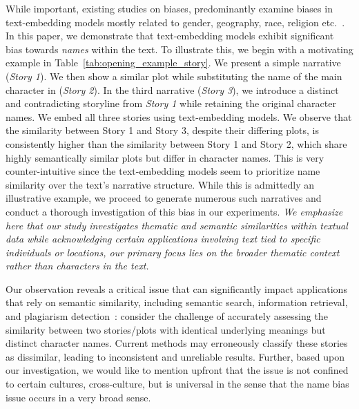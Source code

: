 While important, existing studies on biases, predominantly examine biases in text-embedding models mostly related to gender, geography, race, religion etc.~\citep{rakivnenko2024bias, may2019measuring, bolukbasi2016man, kotek2023gender, nghiem2024you}. In this paper, we demonstrate that text-embedding models exhibit significant bias towards \textit{names} within the text. To illustrate this, we begin with a motivating example in Table~\ref{tab:opening_example_story}. We present a simple narrative (\textit{Story 1}). We then show a similar plot while substituting the name of the main character in (\textit{Story 2}). In the third narrative (\textit{Story 3}), we introduce a distinct and contradicting storyline from \textit{Story 1 }while retaining the original character names. We embed all three stories using text-embedding models.  We observe that the similarity between Story 1 and Story 3, despite their differing plots, is consistently higher than the similarity between Story 1 and Story 2, which share highly semantically similar plots but differ in character names. This is very counter-intuitive since the text-embedding models seem to prioritize name similarity over the text's narrative structure. While this is admittedly an illustrative example, we proceed to generate numerous such narratives and conduct a thorough investigation of this bias in our experiments. {\em We emphasize here that our study investigates thematic and semantic similarities within textual data while acknowledging certain applications involving text tied to specific individuals or locations, our primary focus lies on the broader thematic context rather than characters in the text.}

Our observation reveals a critical issue that can significantly impact applications that rely on semantic similarity, including semantic search, information retrieval, and plagiarism detection~\citep{minaee2024large, pudasaini2024survey}: consider the challenge of accurately assessing the similarity between two stories/plots with identical underlying meanings but distinct character names. Current methods may erroneously classify these stories as dissimilar, leading to inconsistent and unreliable results. Further, based upon our investigation, we would like to mention upfront that the issue is not confined to certain cultures, cross-culture, but is universal in the sense that the name bias issue occurs in a very broad sense.


